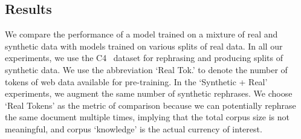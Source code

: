 \documentclass[table]{article}
\newcommand{\ours}{\textbf{WRAP}}
\begin{document}
\begin{table}[t]
    \centering
    \caption{Evaluation of $\sim1.3$B parameter LLMs on `Specialized Knowledge Tasks'  that require specific domain knowledge such as science, medicine, mathematics, and logic. Results for \ours are averaged over 3 runs.}
    \label{tab:specialized_knowledge}
\end{table}

\subsection{Results}
We compare the performance of a model trained on a mixture of real and synthetic data with models trained on various splits of real data. In all our experiments, we use the C4~\citep{raffel2020exploring} dataset for rephrasing and producing splits of synthetic data. 
We use the abbreviation `Real Tok.' to denote the number of tokens of web data available for pre-training. In the `Synthetic + Real' experiments, we augment the same number of synthetic rephrases. We choose `Real Tokens' as the metric of comparison because we can potentially rephrase the same document multiple times, implying that the total corpus size is not meaningful, and corpus `knowledge' is the actual currency of interest.
\end{document}
